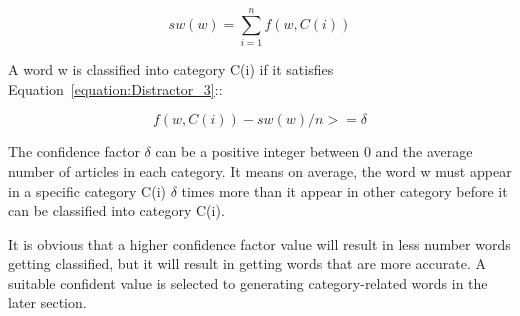 \begin{equation}
sw (w) = \sum_{i=1}^{n} f(w,C(i))
\label{equation:Distractor_1}
\end{equation}  

A word w is classified into category C(i) if it satisfies Equation~\ref{equation:Distractor_3}::

\begin{equation}
f (w, C(i)) - sw(w)/n >= \delta
\label{equation:Distractor_3} 
\end{equation}  

The confidence factor $\delta$ can be a positive integer between 0 and the average number of articles in each category. It means on average, the word w must appear in a specific category C(i) $\delta$ times more than it appear in other category before it can be classified into category C(i).

It is obvious that a higher confidence factor value will result in less number words getting classified, but it will result in getting words that are more accurate. A suitable confident value is selected to generating category-related words in the later section.





